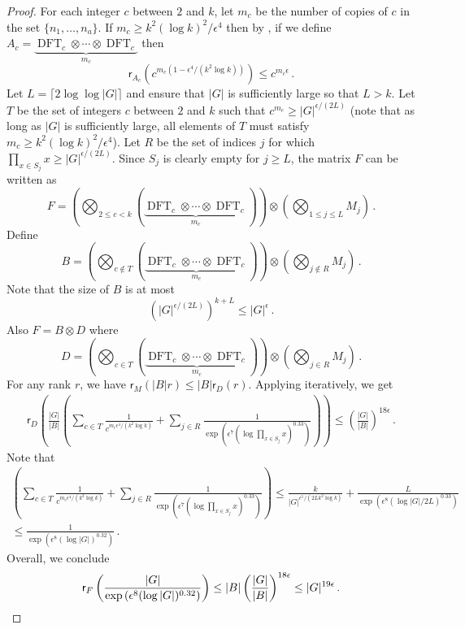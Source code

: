 \documentclass{toc}
\DeclareMathOperator{\DFT}{DFT}
\begin{document}
\begin{proof}
For each integer $c$ between $2$ and $k$, let $m_c$ be the number of copies of $c$ in the set $\{n_1, \dots , n_a \}$.  If $m_c \geq k^2 (\log k)^2/\epsilon^4 $ then by , if we define %
$A_c = \underbrace{\DFT_c \otimes \cdots \otimes \DFT_c}_{\text{$m_c$}}$ %
 then 
\[
\textsf{r}_{A_c}\left(c^{m_c(1 - \epsilon^4/(k^2 \log k))}\right) \leq c^{m_c \epsilon} \,.
\]
Let $L = \lceil 2\log \log |G| \rceil$ and ensure that $|G|$ is sufficiently large so that $L > k$.  Let $T$ be the set of integers $c$ between $2$ and $k$ such that $c^{m_c} \geq |G|^{\epsilon/(2L)}$ (note that as long as $|G|$ is sufficiently large, all elements of $T$ must satisfy $m_c \geq k^2 (\log k)^2/\epsilon^4 $).  Let $R$ be the set of indices $j$ for which $\prod_{x \in S_j}x \geq |G|^{\epsilon/(2L)}$.  Since $S_j$ is clearly empty for $j \geq L$, the matrix $F$ can be written as 
%
%
%
%
\[
F = \left( \bigotimes_{2 \leq c < k} \left( \underbrace{\DFT_c \otimes \cdots \otimes \DFT_c}_{\text{$m_c$}}\right) \right) \otimes \left(\bigotimes_{1 \leq j \leq L} M_j \right) \,.
\]
%
Define 
%
%
\[B = \left( \bigotimes_{c \notin T} \left( \underbrace{\DFT_c \otimes \cdots \otimes \DFT_c}_{\text{$m_c$}}\right) \right) \otimes \left(\bigotimes_{j \notin R} M_j \right) \,. \]
%
Note that the size of $B$ is at most 
\[
\left( |G|^{\epsilon/(2L)}\right)^{k + L} \leq |G|^{\epsilon} \,.
\]
Also $F = B \otimes D$ where
%
%
%
%
\[
D =  \left( \bigotimes_{c \in T} \left( \underbrace{\DFT_c \otimes \cdots \otimes \DFT_c}_{\text{$m_c$}}\right) \right) \otimes \left(\bigotimes_{j \in R} M_j \right) \,.
\]
%
For any rank $r$, %
we have %
$\textsf{r}_M(|B|r) \leq |B|\textsf{r}_D(r)$.  Applying  iteratively, we get 
\begin{align*}
\textsf{r}_D\left(\frac{|G|}{|B|}\left( \sum_{c \in T}\frac{1}{c^{m_c\epsilon^4/(k^2 \log k)}} + \sum_{j \in R}\frac{1}{\exp\left(\epsilon^7 (\log \prod_{x \in S_j}x )^{0.33}\right)} \right)\right) \leq \left(\frac{|G|}{|B|}\right)^{18 \epsilon} \,.
\end{align*}
Note that 
\begin{align*}
\left( \sum_{c \in T}\frac{1}{c^{m_c \epsilon^4/(k^2 \log k)}} + \sum_{j \in R}\frac{1}{\exp\left(\epsilon^7 (\log \prod_{x \in S_j}x )^{0.33}\right)} \right) \leq \frac{k}{|G|^{\epsilon^5/(2Lk^2 \log k)}} + \frac{L}{\exp\left(\epsilon^8 (\log |G|/2L)^{0.33}\right)} \\ \leq \frac{1}{\exp\left(\epsilon^8 (\log |G|)^{0.32}\right)} \,.
\end{align*}
Overall, we conclude
\[
\textsf{r}_F\left(\frac{|G|}{\exp\left(\epsilon^8 (\log |G|)^{0.32}\right)}\right) \leq |B|\left(\frac{|G|}{|B|}\right)^{18 \epsilon} \leq |G|^{19 \epsilon} \,.\qedhere
\]
\end{proof}
%
\end{document}
